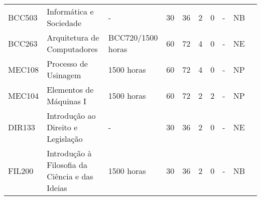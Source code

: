 \begin{table}[tbp]
{\begin{tabular}{llllllllll}
			\multicolumn{1}{|l|}{BCC503}                    & \multicolumn{1}{l|}{Informática e Sociedade}                                              & \multicolumn{1}{l|}{-}                      & \multicolumn{1}{l|}{30}                                                           & \multicolumn{1}{l|}{36}               & \multicolumn{1}{l|}{2}  & \multicolumn{1}{l|}{0}  & \multicolumn{1}{l|}{-}                & \multicolumn{1}{l|}{NB}            &  \\ \cline{1-9}
			\multicolumn{1}{|l|}{BCC263}                    & \multicolumn{1}{l|}{Arquitetura de Computadores}                                          & \multicolumn{1}{l|}{BCC720/1500 horas}      & \multicolumn{1}{l|}{60}                                                           & \multicolumn{1}{l|}{72}               & \multicolumn{1}{l|}{4}  & \multicolumn{1}{l|}{0}  & \multicolumn{1}{l|}{-}                & \multicolumn{1}{l|}{NE}            &  \\ \cline{1-9}
			\multicolumn{1}{|l|}{MEC108}                    & \multicolumn{1}{l|}{Processo de Usinagem}                                                 & \multicolumn{1}{l|}{1500 horas}             & \multicolumn{1}{l|}{60}                                                           & \multicolumn{1}{l|}{72}               & \multicolumn{1}{l|}{4}  & \multicolumn{1}{l|}{0}  & \multicolumn{1}{l|}{-}                & \multicolumn{1}{l|}{NP}            &  \\ \cline{1-9}
			\multicolumn{1}{|l|}{MEC104}                    & \multicolumn{1}{l|}{Elementos de Máquinas I}                                              & \multicolumn{1}{l|}{1500 horas}             & \multicolumn{1}{l|}{60}                                                           & \multicolumn{1}{l|}{72}               & \multicolumn{1}{l|}{2}  & \multicolumn{1}{l|}{2}  & \multicolumn{1}{l|}{-}                & \multicolumn{1}{l|}{NP}            &  \\ \cline{1-9}
			\multicolumn{1}{|l|}{DIR133}                    & \multicolumn{1}{l|}{Introdução ao Direito e Legislação}                                   & \multicolumn{1}{l|}{-}                      & \multicolumn{1}{l|}{30}                                                           & \multicolumn{1}{l|}{36}               & \multicolumn{1}{l|}{2}  & \multicolumn{1}{l|}{0}  & \multicolumn{1}{l|}{-}                & \multicolumn{1}{l|}{NE}            &  \\ \cline{1-9}
			\multicolumn{1}{|l|}{FIL200}                    & \multicolumn{1}{l|}{Introdução à Filosofia da Ciência e das Ideias}                       & \multicolumn{1}{l|}{1500 horas}             & \multicolumn{1}{l|}{30}                                                           & \multicolumn{1}{l|}{36}               & \multicolumn{1}{l|}{2}  & \multicolumn{1}{l|}{0}  & \multicolumn{1}{l|}{-}                & \multicolumn{1}{l|}{NB}            &  \\ \cline{1-9}

\end{tabular}}
\end{table}
